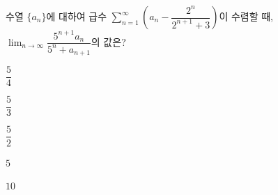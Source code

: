 수열 $\{a_n\}$에 대하여 급수 $\displaystyle\sum_{n=1}^{\infty}\left(a_n-\dfrac{2^n}{2^{n+1}+3}\right)$이 수렴할 때, $\displaystyle\lim_{n\to\infty}\dfrac{5^{n+1}a_n}{5^n+a_{n+1}}$의 값은?
\begin{choices32}{\rule[-3ex]{0pt}{8ex}$\dfrac{5}{4}$}{\rule[-3ex]{0pt}{8ex}$\dfrac{5}{3}$}{\rule[-3ex]{0pt}{8ex}$\dfrac{5}{2}$}{\rule[-3ex]{0pt}{8ex}$5$}{\rule[-3ex]{0pt}{8ex}$10$}\end{choices32}
